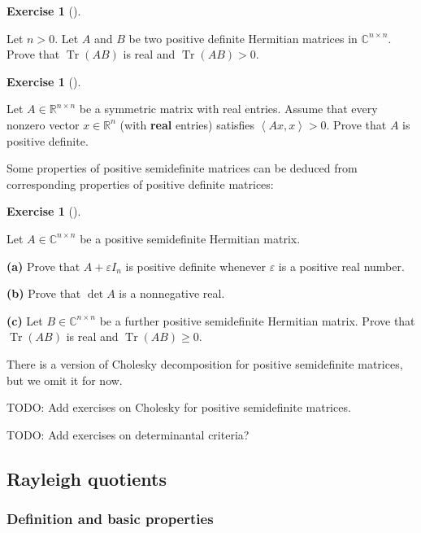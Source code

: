 \documentclass[numbers=enddot,12pt,final,onecolumn,notitlepage]{scrartcl}%
\newcounter{exer}
\numberwithin{exer}{subsection}
\theoremstyle{definition}
\newtheorem{exmp}[exer]{Exercise}
\newenvironment{exercise}[1][]
{\begin{exmp}[#1]\begin{leftbar}}
{\end{leftbar}\end{exmp}}
\newenvironment{noncompile}{}{}
\begin{document}
\begin{exercise}
 Let $n>0$. Let $A$ and $B$ be two positive definite Hermitian
matrices in $\mathbb{C}^{n\times n}$. Prove that $\operatorname*{Tr}\left(
AB\right)  $ is real and $\operatorname*{Tr}\left(  AB\right)  >0$.
\end{exercise}

\begin{exercise}
 Let $A\in\mathbb{R}^{n\times n}$ be a symmetric matrix with real
entries. Assume that every nonzero vector $x\in\mathbb{R}^{n}$ (with
\textbf{real} entries) satisfies $\left\langle Ax,x\right\rangle >0$. Prove
that $A$ is positive definite.
\end{exercise}

Some properties of positive semidefinite matrices can be deduced from
corresponding properties of positive definite matrices:

\begin{exercise}
 Let $A\in\mathbb{C}^{n\times n}$ be a positive semidefinite Hermitian
matrix. \medskip

\textbf{(a)} Prove that $A+\varepsilon I_{n}$ is positive definite whenever
$\varepsilon$ is a positive real number. \medskip

\textbf{(b)} Prove that $\det A$ is a nonnegative real. \medskip

\textbf{(c)} Let $B\in\mathbb{C}^{n\times n}$ be a further positive
semidefinite Hermitian matrix. Prove that $\operatorname*{Tr}\left(
AB\right)  $ is real and $\operatorname*{Tr}\left(  AB\right)  \geq0$.
\end{exercise}

There is a version of Cholesky decomposition for positive semidefinite
matrices, but we omit it for now.

\begin{noncompile}
TODO: Add exercises on Cholesky for positive semidefinite matrices.

TODO: Add exercises on determinantal criteria?
\end{noncompile}

\subsection{Rayleigh quotients}

\subsubsection{Definition and basic properties}
\end{document}
